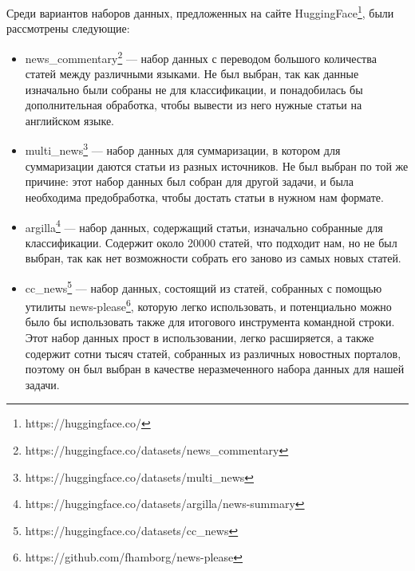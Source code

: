 \documentclass[a4paper,14pt]{extarticle}
\begin{document}
    Среди вариантов наборов данных, предложенных на сайте HuggingFace\footnote{https://huggingface.co/}, были рассмотрены следующие:
    \begin{itemize}
        \item news\_commentary\footnote{https://huggingface.co/datasets/news\_commentary} --- набор данных с переводом большого количества статей между различными языками. Не был выбран, так как данные изначально были собраны не для классификации, и понадобилась бы дополнительная обработка, чтобы вывести из него нужные статьи на английском языке.
        \item multi\_news\footnote{https://huggingface.co/datasets/multi\_news} --- набор данных для суммаризации, в котором для суммаризации даются статьи из разных источников. Не был выбран по той же причине: этот набор данных был собран для другой задачи, и была необходима предобработка, чтобы достать статьи в нужном нам формате.
        \item argilla\footnote{https://huggingface.co/datasets/argilla/news-summary} --- набор данных, содержащий статьи, изначально собранные для классификации. Содержит около 20000 статей, что подходит нам, но не был выбран, так как нет возможности собрать его заново из самых новых статей.
        \item cc\_news\footnote{https://huggingface.co/datasets/cc\_news} --- набор данных, состоящий из статей, собранных с помощью утилиты news-please\footnote{https://github.com/fhamborg/news-please}, которую легко использовать, и потенциально можно было бы использовать также для итогового инструмента командной строки. Этот набор данных прост в использовании, легко расширяется, а также содержит сотни тысяч статей, собранных из различных новостных порталов, поэтому он был выбран в качестве неразмеченного набора данных для нашей задачи.
    \end{itemize}
    
\end{document}
